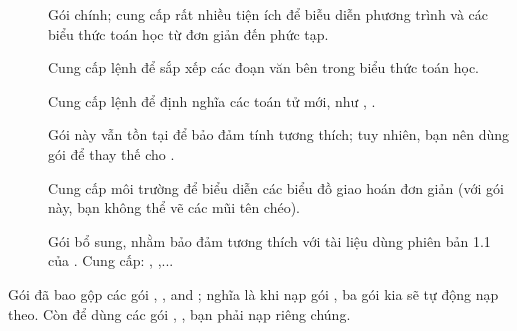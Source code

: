 \begin{description}
\item[]
	Gói chính; cung cấp rất nhiều tiện ích để biễu diễn phương trình
	và các biểu thức toán học từ đơn giản đến phức tạp.

\item[]
	Cung cấp lệnh  để sắp xếp các đoạn văn bên trong
	biểu thức toán học.

\item[]
	Cung cấp lệnh  để định nghĩa
	các toán tử mới, như , .

\item[]
	Gói này vẫn tồn tại để bảo đảm tính tương thích; tuy nhiên,
	bạn nên dùng gói  để thay thế cho .

\item[]
	Cung cấp môi trường  để biểu diễn các biểu đồ giao hoán
	đơn giản (với gói này, bạn không thể vẽ các mũi tên chéo).

\item[]
	Gói bổ sung, nhằm bảo đảm tương thích với tài liệu dùng phiên bản 1.1
	của . Cung cấp: , ,...

\end{description}

\medskip
Gói  đã bao gộp các gói , , and
; nghĩa là khi nạp gói , ba gói kia sẽ tự động
nạp theo. Còn để dùng các gói , , bạn phải nạp riêng chúng.

